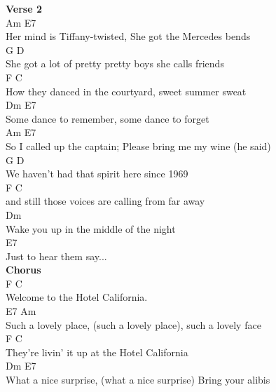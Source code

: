 \documentclass[a4paper]{article}
\begin{document}
{{        }
        \textbf{Verse 2}
        ~\\
        {
            \cutive
            \obeyspaces
Am                            E7
\\
 Her mind is Tiffany-twisted, She got the Mercedes bends
\\
G                                    D
\\
 She got a lot of pretty pretty boys   she calls friends
\\
F                                   C
\\
  How they danced in the courtyard, sweet summer sweat
\\
Dm                       E7
\\
  Some dance to remember, some dance to forget
\\
Am                           E7
\\
  So I called up the captain; Please bring me my wine (he said)
\\
G                                     D
\\
 We haven't had that spirit here since 1969
\\
F                                         C
\\
  and still those voices are calling from far away
\\
Dm
\\
   Wake you up in the middle of the night
\\
E7
\\
  Just to hear them say...
\\

        }
        \textbf{Chorus}
        ~\\
        {
            \cutive
            \obeyspaces
F                         C
\\
 Welcome to the Hotel California.
\\
       E7                                          Am
\\
Such a lovely place, (such a lovely place), such a lovely face
\\
        F                             C
\\
They're livin' it up at the Hotel California
\\
       Dm                                               E7
\\
What a nice surprise, (what a nice surprise) Bring your alibis
\\

}}
\end{document}
